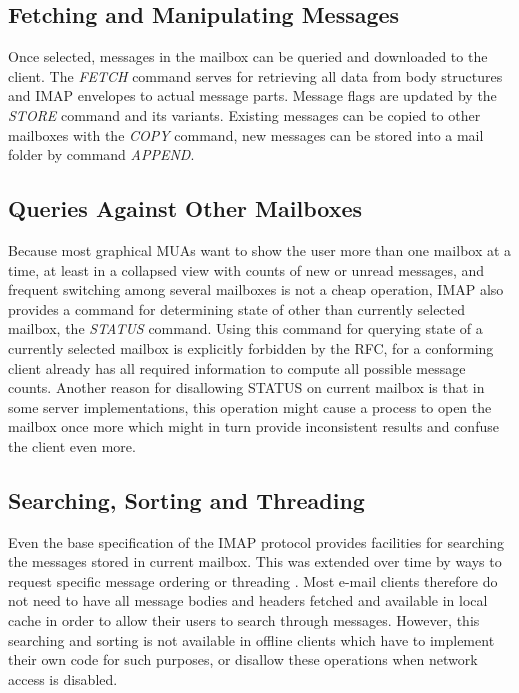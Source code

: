 \documentclass[12pt,notitlepage]{report}
\begin{document}
\subsection{Fetching and Manipulating Messages}

Once selected, messages in the mailbox can be queried and downloaded to the
client.  The {\em FETCH} command serves for retrieving all data from body
structures and IMAP envelopes to actual message parts.  Message flags are
updated by the {\em STORE} command and its variants.  Existing messages can be
copied to other mailboxes with the {\em COPY} command, new messages can be
stored into a mail folder by command {\em APPEND}.

\subsection{Queries Against Other Mailboxes}

Because most graphical MUAs want to show the user more than one mailbox at a
time, at least in a collapsed view with counts of new or unread messages, and
frequent switching among several mailboxes is not a cheap operation, IMAP also
provides a command for determining state of other than currently selected mailbox,
the {\em STATUS} command.  Using this command for querying state of a currently
selected mailbox is explicitly forbidden by the RFC, for a conforming client
already has all required information to compute all possible message counts.
Another reason for disallowing STATUS on current mailbox is that in some server
implementations, this operation might cause a process to open the mailbox once
more which might in turn provide inconsistent results and confuse the client
even more.

\subsection{Searching, Sorting and Threading}

Even the base specification of the IMAP protocol provides facilities for
searching the messages stored in current mailbox.  This was extended over time
by ways to request specific message ordering or threading \cite{rfc-threading}.
Most e-mail clients therefore do not need to have all message bodies and headers
fetched and available in local cache in order to allow their users to search
through messages.  However, this searching and sorting is not available in
offline clients which have to implement their own code for such purposes, or
disallow these operations when network access is disabled.
\end{document}
